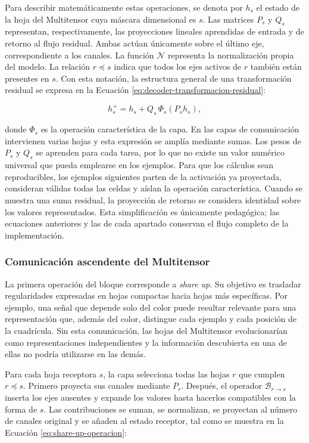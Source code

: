\documentclass[11pt,a4paper,spanish]{book}
\numberwithin{equation}{chapter}
\numberwithin{figure}{chapter}
\begin{document}
Para describir matemáticamente estas operaciones, se denota por \(h_s\) el estado de la hoja del Multitensor cuya máscara
dimensional es \(s\). Las matrices \(P_s\) y \(Q_s\) representan, respectivamente, las proyecciones lineales aprendidas de entrada
y de retorno al flujo residual. Ambas actúan únicamente sobre el último eje, correspondiente a los canales. La función
\(\mathcal{N}\) representa la normalización propia del modelo. La relación \(r\preceq s\) indica que todos los ejes activos de
\(r\) también están presentes en \(s\). Con esta notación, la estructura general de una transformación residual se expresa en la
Ecuación \eqref{eq:decoder-transformacion-residual}:

\begin{equation}\label{eq:decoder-transformacion-residual}
h_s^{+}=h_s+Q_s\,\Phi_s(P_s h_s),
\end{equation}

donde \(\Phi_s\) es la operación característica de la capa. En las capas de comunicación intervienen varias hojas y esta expresión
se amplía mediante sumas. Los pesos de \(P_s\) y \(Q_s\) se aprenden para cada tarea, por lo que no existe un valor numérico universal
que pueda emplearse en los ejemplos. Para que los cálculos sean reproducibles, los ejemplos siguientes parten de la activación ya
proyectada, consideran válidas todas las celdas y aíslan la operación característica. Cuando se muestra una suma residual, la
proyección de retorno se considera identidad sobre los valores representados. Esta simplificación es únicamente pedagógica; las
ecuaciones anteriores y las de cada apartado conservan el flujo completo de la implementación.

\subsubsection{Comunicación ascendente del Multitensor}

La primera operación del bloque corresponde a \textit{share up}. Su objetivo es trasladar regularidades expresadas en hojas
compactas hacia hojas más específicas. Por ejemplo, una señal que depende solo del color puede resultar relevante para una
representación que, además del color, distingue cada ejemplo y cada posición de la cuadrícula. Sin esta comunicación, las hojas del
Multitensor evolucionarían como representaciones independientes y la información descubierta en una de ellas no podría utilizarse en
las demás.

Para cada hoja receptora \(s\), la capa selecciona todas las hojas \(r\) que cumplen \(r\preceq s\). Primero proyecta sus canales
mediante \(P_r\). Después, el operador \(\mathcal{B}_{r\rightarrow s}\) inserta los ejes ausentes y expande los valores hasta hacerlos
compatibles con la forma de \(s\). Las contribuciones se suman, se normalizan, se proyectan al número de canales original y se añaden
al estado receptor, tal como se muestra en la Ecuación \eqref{eq:share-up-operacion}:
\end{document}
